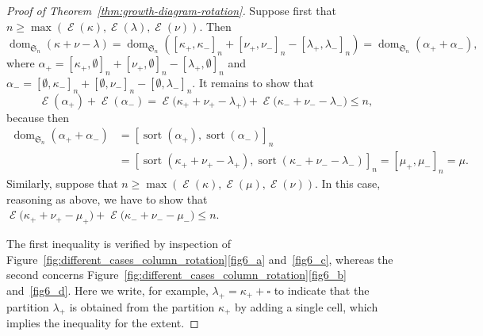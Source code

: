 \documentclass[10pt]{article}
\theoremstyle{definition}
\newcommand{\fS}{\mathfrak{S}}
\DeclareMathOperator{\dom}{dom} %
\DeclareMathOperator{\domS}{sort} %
\DeclareMathOperator{\extent}{\mathcal{E}} %
\newcommand{\pos}[1]{#1_+} %
\renewcommand{\neg}[1]{#1_-} %
\begin{document}
\begin{proof}[Proof of Theorem~\ref{thm:growth-diagram-rotation}]
 Suppose first that
 $n\geq\max(\extent(\kappa),\extent(\lambda),\extent(\nu))$. Then
 \[
 \dom_{\fS_n}(\kappa+\nu-\lambda)=\dom_{\fS_n}([\pos\kappa,\neg\kappa]_n+[\pos\nu,\neg\nu]_n-[\pos\lambda,\neg\lambda]_n)
 =\dom_{\fS_n}(\pos\alpha + \neg\alpha),
 \]
 where
 $\pos\alpha =
 [\pos\kappa,\emptyset]_n+[\pos\nu,\emptyset]_n-[\pos\lambda,\emptyset]_n$
 and
 $\neg\alpha=[\emptyset,\neg\kappa]_n+[\emptyset,\neg\nu]_n-[\emptyset,\neg\lambda]_n$.
 It remains to show that
 \[
 \extent(\pos\alpha) + \extent(\neg\alpha)
 =\extent\big(\pos\kappa+\pos\nu-\pos\lambda\big) +
 \extent\big(\neg\kappa+\neg\nu-\neg\lambda\big)\leq n,
 \]
 because then
 \begin{align*}
 \dom_{\fS_n}(\pos\alpha+\neg\alpha) &= [\domS(\pos\alpha),\domS(\neg\alpha)]_n\\
 &= [\domS(\pos\kappa+\pos\nu-\pos\lambda),
 \domS(\neg\kappa+\neg\nu-\neg\lambda)]_n = [\pos\mu,\neg\mu]_n =
 \mu.
 \end{align*}
 Similarly, suppose that
 $n\geq\max(\extent(\kappa),\extent(\mu),\extent(\nu))$. In this
 case, reasoning as above, we have to show that
 $\extent\big(\pos\kappa+\pos\nu-\pos\mu\big) +
 \extent\big(\neg\kappa+\neg\nu-\neg\mu\big)\leq n$.

 The first inequality is verified by inspection of
 Figure~\ref{fig:different_cases_column_rotation}\ref{fig6_a} and~\ref{fig6_c}, whereas
 the second concerns
 Figure~\ref{fig:different_cases_column_rotation}\ref{fig6_b} and~\ref{fig6_d}. Here we
 write, for example, $\pos\lambda=\pos\kappa+\square$ to indicate
 that the partition $\pos\lambda$ is obtained from the partition
 $\pos\kappa$ by adding a single cell, which implies the inequality
 for the extent.
\end{proof}
\clearpage
\end{document}
